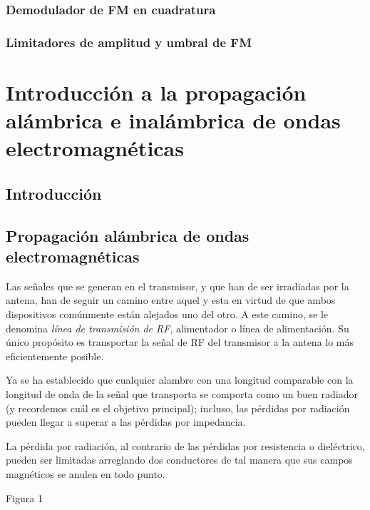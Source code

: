 \documentclass[12pt,letterpaper,titlepage,twoside]{book}
\begin{document}
\subsection{Demodulador de FM en cuadratura}
 
\subsection{Limitadores de amplitud y umbral de FM}

\chapter{Introducción a la propagación alámbrica e inalámbrica de ondas electromagnéticas}

\section{Introducción}
\section{Propagación alámbrica de ondas electromagnéticas} 
Las señales que se generan en el transmisor, y que han de ser irradiadas por la antena, han de seguir un camino entre aquel y esta en virtud de que ambos dispositivos comúnmente están alejados uno del otro. A este camino, se le denomina \emph{línea de transmisión de RF}, alimentador o línea de alimentación. Su único propósito es transportar la señal de RF del transmisor a la antena lo más eficientemente posible.

Ya se ha establecido que cualquier alambre con una longitud comparable con la longitud de onda de la señal que transporta se comporta como un buen radiador (y recordemos cuál es el objetivo principal); incluso, las pérdidas por radiación pueden llegar a superar a las pérdidas por impedancia.

La pérdida por radiación, al contrario de las pérdidas por resistencia o dieléctrico, pueden ser limitadas arreglando dos conductores de tal manera que sus campos magnéticos se anulen en todo punto.

%
Figura 1
\end{document}

